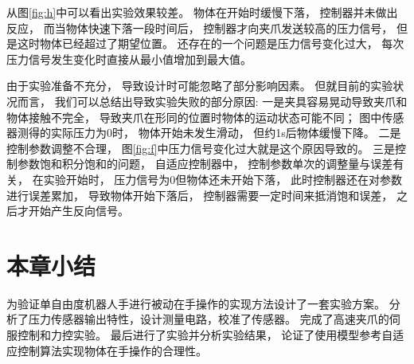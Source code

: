 从图\ref{fig:h}中可以看出实验效果较差。
物体在开始时缓慢下落， 控制器并未做出反应， 而当物体快速下落一段时间后，
控制器才向夹爪发送较高的压力信号， 但是这时物体已经超过了期望位置。
还存在的一个问题是压力信号变化过大， 每次压力信号发生变化时直接从最小值增加到最大值。

由于实验准备不充分， 导致设计时可能忽略了部分影响因素。
但就目前的实验状况而言， 我们可以总结出导致实验失败的部分原因:
一是夹具容易晃动导致夹爪和物体接触不完全，
导致夹爪在形同的位置时物体的运动状态可能不同；
图中传感器测得的实际压力为0时， 物体开始未发生滑动， 但约1s后物体缓慢下降。
二是控制参数调整不合理， 图\ref{fig:f}中压力信号变化过大就是这个原因导致的。
三是控制参数饱和积分饱和的问题， 自适应控制器中， 控制参数单次的调整量与误差有关，
在实验开始时， 压力信号为0但物体还未开始下落， 此时控制器还在对参数进行误差累加，
导致物体开始下落后， 控制器需要一定时间来抵消饱和误差， 之后才开始产生反向信号。



\section{本章小结}
为验证单自由度机器人手进行被动在手操作的实现方法设计了一套实验方案。
分析了压力传感器输出特性，设计测量电路，校准了传感器。
完成了高速夹爪的伺服控制和力控实验。
最后进行了实验并分析实验结果，
论证了使用模型参考自适应控制算法实现物体在手操作的合理性。

